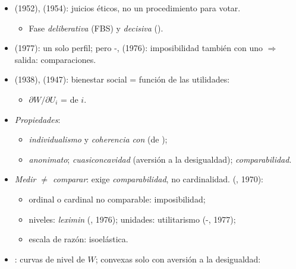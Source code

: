 \documentclass{article}
\begin{document}
\begin{columnas}
\begin{itemize}
\item {} (1952),  (1954): juicios éticos, no un procedimiento para votar.
  \begin{itemize}
  \item Fase \emph{deliberativa} (FBS) y \emph{decisiva} ().
  \end{itemize}
\item {} (1977): un solo perfil; pero -,  (1976): imposibilidad también con uno $\Rightarrow$ salida: comparaciones.
\end{itemize}

\begin{itemize}
\item {} (1938),  (1947): bienestar social = función de las utilidades:
  \begin{itemize}
  \item $\partial W/\partial U_i$ =  de $i$.
  \end{itemize}
\item \emph{Propiedades}:
  \begin{itemize}
  \item \emph{individualismo} y \emph{coherencia con } (de );
  \item \emph{anonimato}; \emph{cuasiconcavidad} (aversión a la desigualdad); \emph{comparabilidad}.
  \end{itemize}
\item \emph{Medir $\neq$ comparar}: exige \emph{comparabilidad}, no cardinalidad.  (, 1970):
  \begin{itemize}
  \item ordinal o cardinal no comparable: imposibilidad;
  \item niveles: \emph{leximin} (, 1976); unidades: utilitarismo (-, 1977);
  \item escala de razón: isoelástica.
  \end{itemize}
\item {}: curvas de nivel de $W$; convexas solo con aversión a la desigualdad:

\end{itemize}
\end{columnas}
\end{document}
